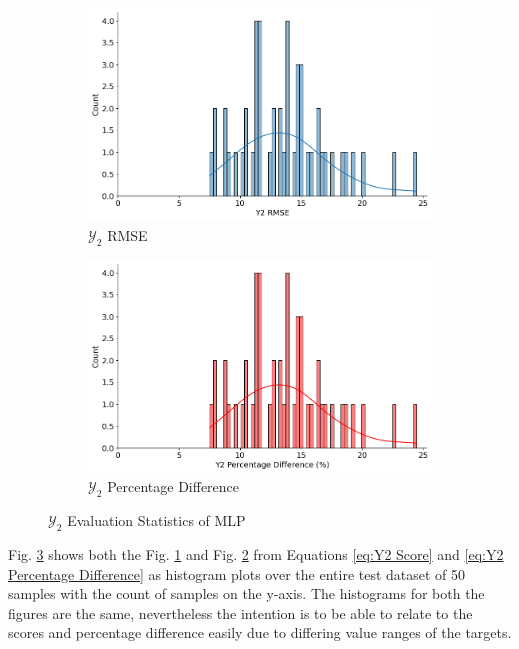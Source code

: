 \documentclass{report} %
\begin{document}
\begin{figure}[H]
    \centering
    \begin{subfigure}{0.5\textwidth}
        \centering
        \includegraphics[width=\textwidth]{./ReportImages/score_MLP_y2.png}
        \caption{$\mathcal{Y}_2$ \ac{RMSE}}
        \label{fig:Y2 RMSE}
    \end{subfigure}\hfill
    \begin{subfigure}{0.5\textwidth}
        \centering
        \includegraphics[width=\textwidth]{./ReportImages/percentage_diff_MLP_y2.png}
        \caption{$\mathcal{Y}_2$ Percentage Difference}
        \label{fig:Y2 Percentage Difference}
    \end{subfigure}
    \caption{$\mathcal{Y}_2$ Evaluation Statistics of \ac{MLP}}
    \label{fig:Y2 Evaluation Statistics MLP}
\end{figure}

Fig. \ref{fig:Y2 Evaluation Statistics MLP} shows both the Fig. \ref{fig:Y2 RMSE} and Fig. \ref{fig:Y2 Percentage Difference} from Equations \ref{eq:Y2 Score} 
and \ref{eq:Y2 Percentage Difference} as histogram plots over the entire test dataset of 50 samples with the count of samples on the y-axis.
The histograms for both the figures are the same, nevertheless the intention is to be able to relate to the scores and percentage difference easily due to differing 
value ranges of the targets.\\
\end{document}
